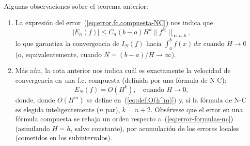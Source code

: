 Algunas observaciones sobre el teorema anterior:
\begin{enumerate}
\item La expresión del error~(\ref{eq:error.fc.compuesta-NC}) nos
  indica que
  \begin{equation*}
    |E_n(f)| \le C_n (b-a) H^k \|f^{k)}\|_{\infty,a,b},
  \end{equation*}
  lo que
  garantiza la convergencia de $I_N(f)$ hacia $\int_a^b f(x)\, dx$
  cuando $H\to 0$ (o, equivalentemente, cuando $N=(b-a)/H \to\infty$).
\item Más aún, la cota anterior nos indica cuál es exactamente la
  velocidad de convergencia en una f.c. compuesta (definida por una
  fórmula de N-C):
  \begin{equation*}
      E_N(f)=O(H^{k}), \quad \text{cuando } H\to 0,
  \end{equation*}
  donde, donde $O(H^m)$ se define en~(\ref{eq:def.O(h^m)}) y, si la
  fórmula de N-C es elegida inteligentemente ($n$ par), $k=n+2$.
  Obsérvese que el error en una fórmula compuesta se rebaja un orden
  respecto a~(\ref{eq:error-formulas-nc}) (asimilando $H =
  h$, salvo constante), por acumulación de los errores locales
  (cometidos en los subintervalos).
\end{enumerate}

